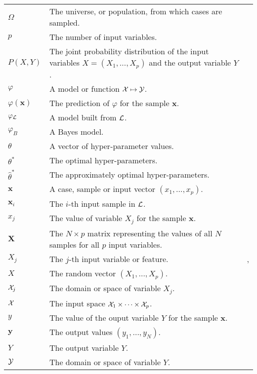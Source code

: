 \begin{tabularx}{\textwidth}{ l X l }
$\Omega$ & The universe, or population, from which cases are sampled. & \pageref{ntn:omega} \\
$p$ & The number of input variables. & \pageref{ntn:p} \\
$P(X,Y)$ & The joint probability distribution of the input variables $X=(X_1,\dots,X_p)$ and the output variable $Y$. & \pageref{ntn:P_XY} \\
$\varphi$ & A model or function ${\cal X} \mapsto {\cal Y}$. & \pageref{ntn:varphi} \\
$\varphi(\mathbf{x})$ & The prediction of $\varphi$ for the sample $\mathbf{x}$. & \pageref{ntn:varphi-x} \\
$\varphi_{\cal L}$ & A model built from ${\cal L}$. & \pageref{ntn:varphi-L} \\
$\varphi_B$ & A Bayes model. & \pageref{ntn:varphi-B} \\
$\theta$ & A vector of hyper-parameter values. & \pageref{ntn:theta} \\
$\theta^*$ & The optimal hyper-parameters. & \pageref{ntn:theta-star} \\
$\widehat{\theta}^*$ & The approximately optimal hyper-parameters. & \pageref{ntn:theta-star-approx} \\
$\textbf{x}$ & A case, sample or input vector $(x_1, \dots, x_p)$. & \pageref{ntn:sample-x} \\
$\textbf{x}_i$ & The $i$-th input sample in ${\cal L}$. & \pageref{ntn:sample-x_i} \\
$x_j$ & The value of variable $X_j$ for the sample $\textbf{x}$. & \pageref{ntn:value-x_j} \\
$\textbf{X}$ & The $N\times p$ matrix representing the values of all $N$ samples for all $p$ input variables. & \pageref{ntn:matrix-X} \\
$X_j$ & The $j$-th input variable or feature. & \pageref{ntn:var-X_j}, \pageref{ntn:var-X_j2} \\
$X$ & The random vector $(X_1,\dots,X_p)$. & \pageref{ntn:vector-X}\\
${\cal X}_j$ & The domain or space of variable $X_j$. & \pageref{ntn:space-X_j} \\
${\cal X}$ & The input space ${\cal X}_1 \times \dots \times {\cal X}_p$. & \pageref{ntn:space-X} \\
$y$ & The value of the ouput variable $Y$ for the sample $\textbf{x}$. & \pageref{ntn:value-y} \\
$\mathbf{y}$ & The output values $(y_1,\dots,y_N)$. & \pageref{ntn:vector-y} \\
$Y$ & The output variable $Y$. & \pageref{ntn:var-Y} \\
${\cal Y}$ & The domain or space of variable $Y$. & \pageref{ntn:space-Y} \\
\end{tabularx}
